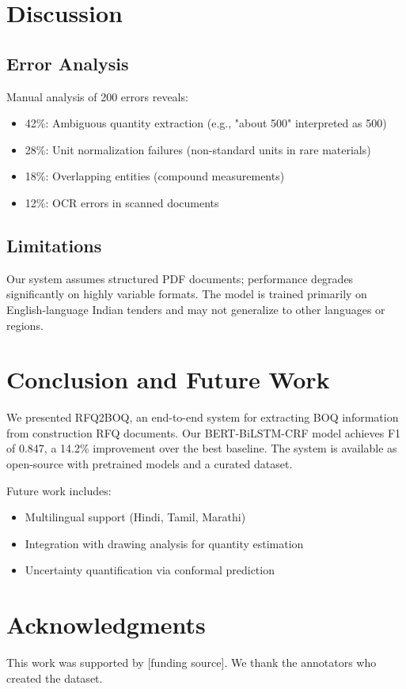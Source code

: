 \documentclass[pdftex,11pt]{article}
\begin{document}
\section{Discussion}

\subsection{Error Analysis}
Manual analysis of 200 errors reveals:
\begin{itemize}
    \item 42\%: Ambiguous quantity extraction (e.g., "about 500" interpreted as 500)
    \item 28\%: Unit normalization failures (non-standard units in rare materials)
    \item 18\%: Overlapping entities (compound measurements)
    \item 12\%: OCR errors in scanned documents
\end{itemize}

\subsection{Limitations}
Our system assumes structured PDF documents; performance degrades significantly on highly variable formats. The model is trained primarily on English-language Indian tenders and may not generalize to other languages or regions.

\section{Conclusion and Future Work}

We presented RFQ2BOQ, an end-to-end system for extracting BOQ information from construction RFQ documents. Our BERT-BiLSTM-CRF model achieves F1 of 0.847, a 14.2\% improvement over the best baseline. The system is available as open-source with pretrained models and a curated dataset.

Future work includes:
\begin{itemize}
    \item Multilingual support (Hindi, Tamil, Marathi)
    \item Integration with drawing analysis for quantity estimation
    \item Uncertainty quantification via conformal prediction
\end{itemize}

\section*{Acknowledgments}

This work was supported by [funding source]. We thank the annotators who created the dataset.



\end{document}
